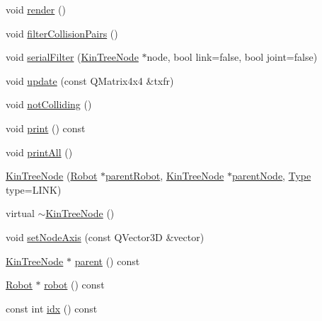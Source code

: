 \begin{DoxyCompactItemize}
\item 
void \hyperlink{class_robot_model_1_1_kin_tree_node_a85f4364980f9144471b9d92e175c539e}{render} ()
\item 
void \hyperlink{class_robot_model_1_1_kin_tree_node_a51113339b5ffc471c058218f1294d73a}{filterCollisionPairs} ()
\item 
void \hyperlink{class_robot_model_1_1_kin_tree_node_adc5e295285315ab45b65c1dceeee1770}{serialFilter} (\hyperlink{class_robot_model_1_1_kin_tree_node}{KinTreeNode} $\ast$node, bool link=false, bool joint=false)
\item 
void \hyperlink{class_robot_model_1_1_kin_tree_node_a7edaa7f382637f6a15c3af68f4dfc7ab}{update} (const QMatrix4x4 \&txfr)
\item 
void \hyperlink{class_robot_model_1_1_kin_tree_node_ae5d72a496f39cad4e266c11d75d4731c}{notColliding} ()
\item 
void \hyperlink{class_robot_model_1_1_kin_tree_node_a788349199227101ec9e5a478842a1959}{print} () const 
\item 
void \hyperlink{class_robot_model_1_1_kin_tree_node_af682a96a09f754e0fb82066560538241}{printAll} ()
\item 
\hyperlink{class_robot_model_1_1_kin_tree_node_a0ee910d623799e97855e387b052cb83a}{KinTreeNode} (\hyperlink{class_robot_model_1_1_robot}{Robot} $\ast$\hyperlink{class_robot_model_1_1_kin_tree_node_aabd31bc0263bb2a830bde65af0eba1a6}{parentRobot}, \hyperlink{class_robot_model_1_1_kin_tree_node}{KinTreeNode} $\ast$\hyperlink{class_robot_model_1_1_kin_tree_node_af2a0ed90edef2013eeadcd5b5174c420}{parentNode}, \hyperlink{class_robot_model_1_1_kin_tree_node_a6cc10fb82046bd1d9f61b806756ad176}{Type} type=LINK)
\item 
virtual \hyperlink{class_robot_model_1_1_kin_tree_node_acff03d8aed8a974e50082449f289992c}{$\sim$KinTreeNode} ()
\item 
void \hyperlink{class_robot_model_1_1_kin_tree_node_a5621900c9c0d0fba3ce350dd446403e8}{setNodeAxis} (const QVector3D \&vector)
\item 
\hyperlink{class_robot_model_1_1_kin_tree_node}{KinTreeNode} $\ast$ \hyperlink{class_robot_model_1_1_kin_tree_node_a58fa5e8933de90d3f4896d39292baa39}{parent} () const 
\item 
\hyperlink{class_robot_model_1_1_robot}{Robot} $\ast$ \hyperlink{class_robot_model_1_1_kin_tree_node_a7bd810e1df470e3d8801ac8f1aa0a60f}{robot} () const 
\item 
const int \hyperlink{class_robot_model_1_1_kin_tree_node_aec76eade3020c48bd3767e5acd330a49}{idx} () const 

\end{DoxyCompactItemize}
